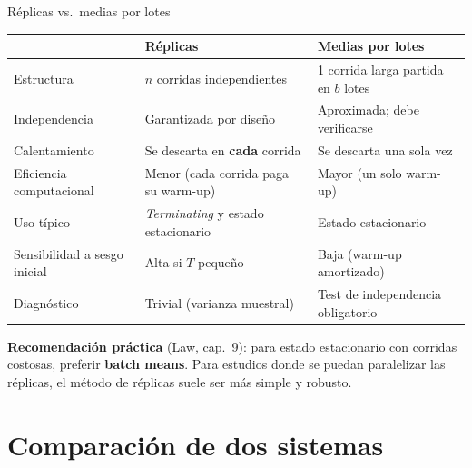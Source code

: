 \documentclass[aspectratio=1610, 10pt]{beamer}
\begin{document}
\begin{frame}{Réplicas vs.\ medias por lotes}
\small
\begin{table}
\centering
\renewcommand{\arraystretch}{1.3}
\begin{tabular}{p{3.6cm}|p{5.4cm}|p{5.4cm}}
\toprule
 & \textbf{Réplicas} & \textbf{Medias por lotes} \\
\midrule
Estructura & $n$ corridas independientes & 1 corrida larga partida en $b$ lotes \\
Independencia & Garantizada por diseño & Aproximada; debe verificarse \\
Calentamiento & Se descarta en \textbf{cada} corrida & Se descarta una sola vez \\
Eficiencia computacional & Menor (cada corrida paga su warm-up) & Mayor (un solo warm-up) \\
Uso típico & \emph{Terminating} y estado estacionario & Estado estacionario \\
Sensibilidad a sesgo inicial & Alta si $T$ pequeño & Baja (warm-up amortizado) \\
Diagnóstico & Trivial (varianza muestral) & Test de independencia obligatorio \\
\bottomrule
\end{tabular}
\end{table}

\vspace{0.2cm}
\textbf{Recomendación práctica} (Law, cap.\ 9): para estado estacionario con corridas costosas, preferir \textbf{batch means}. Para estudios donde se puedan paralelizar las réplicas, el método de réplicas suele ser más simple y robusto.
\end{frame}

\section{Comparación de dos sistemas}
\end{document}
